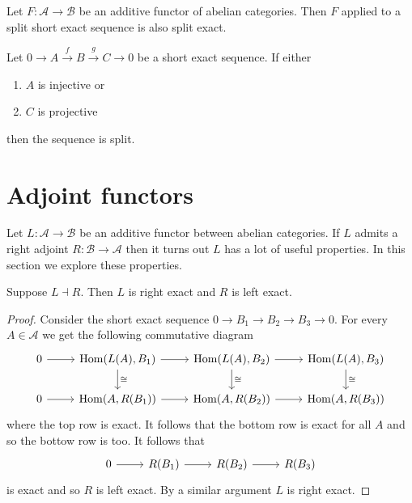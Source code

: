 \documentclass{memoir}
\begin{document}
\begin{corollary}
    Let $F:\mathcal A\to \mathcal B$ be an additive functor of abelian categories.
    Then $F$ applied to a split short exact sequence is also split exact.
\end{corollary}
\begin{proposition}
    Let $0\rightarrow A \xrightarrow{f} B \xrightarrow{g} C \rightarrow 0$ be a short exact sequence.
    If either
    \begin{enumerate}
        \item $A$ is injective or 
        \item $C$ is projective
    \end{enumerate}
    then the sequence is split.
\end{proposition}
\section{Adjoint functors}
Let $L:\mathcal A\to\mathcal B$ be an additive functor between abelian categories.
If $L$ admits a right adjoint $R:\mathcal B\to\mathcal A$ then it turns out $L$ has a lot of useful properties. 
In this section we explore these properties.
\begin{proposition}
    Suppose $L\dashv R$. Then $L$ is right exact and $R$ is left exact.
\end{proposition}
\begin{proof}
    Consider the short exact sequence $0\to B_1\to B_2\to B_3\to 0$. For every $A\in\mathcal A$ we get the following commutative diagram 
    \begin{equation}
        \begin{tikzcd}
            0 \arrow[r] & \Hom(L(A),B_1) \arrow[r] \arrow[d,"\cong"] & \Hom(L(A),B_2) \arrow[r] \arrow[d,"\cong"] & \Hom(L(A),B_3) \arrow[d,"\cong"] \\
            0 \arrow[r] & \Hom(A,R(B_1)) \arrow[r] & \Hom(A,R(B_2)) \arrow[r] & \Hom(A,R(B_3))
        \end{tikzcd}
    \end{equation}
    where the top row is exact.
    It follows that the bottom row is exact for all $A$ and so the bottow row is too.
    It follows that 
    \begin{equation}
        \begin{tikzcd}
            0 \arrow[r] & R(B_1) \arrow[r] & R(B_2) \arrow[r] & R(B_3)
        \end{tikzcd}
    \end{equation}
    is exact and so $R$ is left exact.
    By a similar argument $L$ is right exact.
\end{proof}
\end{document}
